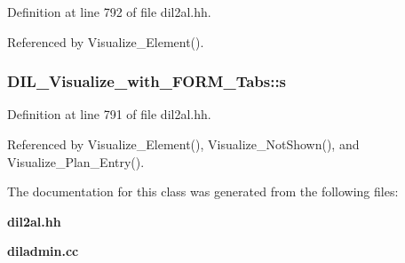 Definition at line 792 of file dil2al.hh.

Referenced by Visualize\_\-Element().
\subsubsection{ DIL\_\-Visualize\_\-with\_\-FORM\_\-Tabs::s\hspace{0.3cm}{\tt  [protected]}}\label{classDIL__Visualize__with__FORM__Tabs_n0}




Definition at line 791 of file dil2al.hh.

Referenced by Visualize\_\-Element(), Visualize\_\-Not\-Shown(), and Visualize\_\-Plan\_\-Entry().

The documentation for this class was generated from the following files:\begin{CompactItemize}
\item 
{\bf dil2al.hh}\item 
{\bf diladmin.cc}\end{CompactItemize}
